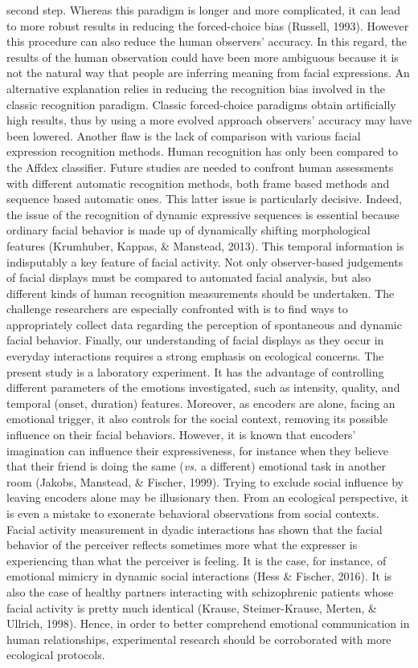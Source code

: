 \documentclass[man]{apa6}
\begin{document}
second step. Whereas this paradigm is longer and more complicated, it can lead to more robust results in reducing the forced-choice bias (Russell, 1993). However this procedure can also reduce the human observers' accuracy. In this regard, the results of the human observation could have been more ambiguous because it is not the natural way that people are inferring meaning from facial expressions. An alternative explanation relies in reducing the recognition bias involved in the classic recognition paradigm. Classic forced-choice paradigms obtain artificially high results, thus by using a more evolved approach observers' accuracy may have been lowered. Another flaw is the lack of comparison with various facial expression recognition methods. Human recognition has only been compared to the Affdex classifier. Future studies are needed to confront human assessments with different automatic recognition methods, both frame based methods and sequence based automatic ones. This latter issue is particularly decisive. Indeed, the issue of the recognition of dynamic expressive sequences is essential because ordinary facial behavior is made up of dynamically shifting morphological features (Krumhuber, Kappas, \& Manstead, 2013). This temporal information is indisputably a key feature of facial activity. Not only observer-based judgements of facial displays must be compared to automated facial analysis, but also different kinds of human recognition measurements should be undertaken. The challenge researchers are especially confronted with is to find ways to appropriately collect data regarding the perception of spontaneous and dynamic facial behavior. Finally, our understanding of facial displays as they occur in everyday interactions requires a strong emphasis on ecological concerns. The present study is a laboratory experiment. It has the advantage of controlling different parameters of the emotions investigated, such as intensity, quality, and temporal (onset, duration) features. Moreover, as encoders are alone, facing an emotional trigger, it also controls for the social context, removing its possible influence on their facial behaviors. However, it is known that encoders' imagination can influence their expressiveness, for instance when they believe that their friend is doing the same (\emph{vs.} a different) emotional task in another room (Jakobs, Manstead, \& Fischer, 1999). Trying to exclude social influence by leaving encoders alone may be illusionary then. From an ecological perspective, it is even a mistake to exonerate behavioral observations from social contexts. Facial activity measurement in dyadic interactions has shown that the facial behavior of the perceiver reflects sometimes more what the expresser is experiencing than what the perceiver is feeling. It is the case, for instance, of emotional mimicry in dynamic social interactions (Hess \& Fischer, 2016). It is also the case of healthy partners interacting with schizophrenic patients whose facial activity is pretty much identical (Krause, Steimer-Krause, Merten, \& Ullrich, 1998). Hence, in order to better comprehend emotional communication in human relationships, experimental research should be corroborated with more ecological protocols.
\end{document}
